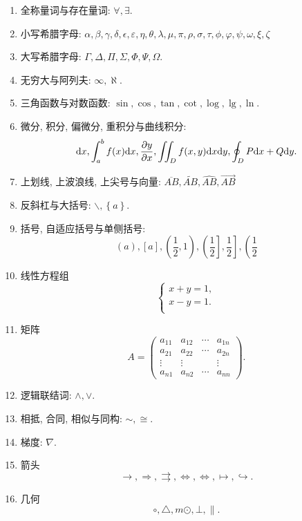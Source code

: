 \documentclass[a4paper, 11pt, UTF8]{article}
\def\d{\textup{d}}
\theoremstyle{plain}
\theoremstyle{definition}
\theoremstyle{remark}
\begin{document}
\begin{enumerate}[1、]
		\item 全称量词与存在量词: $ \forall, \exists $.
		
		\item 小写希腊字母: $ \alpha, \beta, \gamma, \delta, \epsilon, \varepsilon, \eta, \theta, \lambda, \mu, \pi, \rho, \sigma, \tau, \phi, \varphi, \psi, \omega, \xi, \zeta $
		
		\item 大写希腊字母: $\Gamma, \Delta, \Pi, \Sigma, \Phi, \Psi, \Omega$.
		
		\item 无穷大与阿列夫: $ \infty, \aleph $.
		
		\item 三角函数与对数函数: $ \sin, \cos, \tan, \cot, \log, \lg, \ln $.
		
		\item 微分, 积分, 偏微分, 重积分与曲线积分:
		\[ \d x, \int_a^b f(x)\d x, \frac{\partial y}{\partial x}, \iint_D f(x, y) \d x\d y, \oint_D P\d x+Q\d y. \]
		
		\item 上划线, 上波浪线, 上尖号与向量: $ \overline{AB}, \widetilde{AB}, \widehat{AB}, \overrightarrow{AB} $
		
		\item 反斜杠与大括号: $ \backslash, \left\{a\right\} $.
		
		\item 括号, 自适应括号与单侧括号:
		\[ (a), [a], \left(\frac{1}{2}, 1\right), \left(\frac{1}{2}\right], \left.\frac{1}{2}\right], \left(\frac{1}{2}\right. \]
		
		\item 线性方程组
		\[ \left\{\begin{array}{l}
			x+y=1, \\
			x-y=1. \\
		\end{array}\right. \]
	
		\item 矩阵
		\[ A=\left( \begin{array}{*{20}{c}}
		a_{11}	& a_{12} & \cdots & a_{1n} \\
		a_{21}	& a_{22} & \cdots & a_{2n} \\
		\vdots	& \vdots &  & \vdots \\
		a_{n1}	& a_{n2} & \cdots & a_{nn} 
		\end{array} \right).\]
		
		\item 逻辑联结词: $ \wedge, \vee $.
		
		\item 相抵, 合同, 相似与同构: $ \sim, \cong $.
		
		\item 梯度: $ \nabla $.
		
		\item 箭头
		\[ \rightarrow, \Rightarrow, \rightrightarrows, \Leftrightarrow, \iff, \mapsto, \hookrightarrow. \]
		
		\item 几何
		\[ \circ, \triangle,m \odot, \bot, \parallel. \]		
	\end{enumerate}
\end{document}
